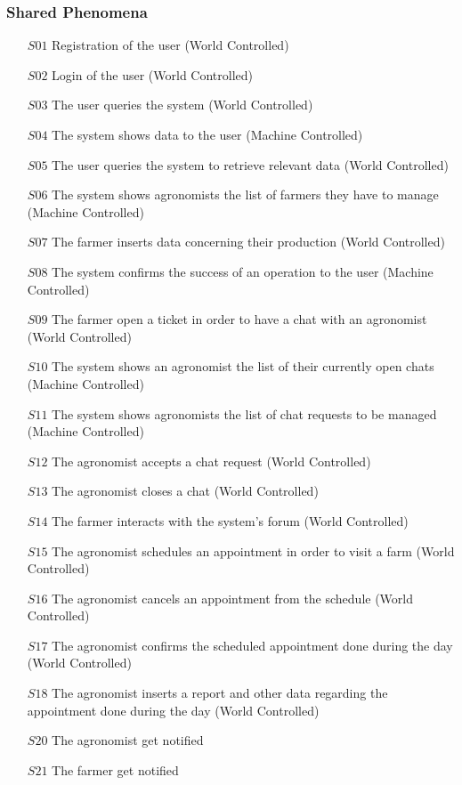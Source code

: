 \documentclass[10pt]{report}
\begin{document}
            \subsubsection{Shared Phenomena}
                \begin{itemize}%
                        \item [$S01$] Registration of the user (World Controlled)
                        \item [$S02$] Login of the user (World Controlled)
                        \item [$S03$] The user queries the system (World Controlled)
                        \item [$S04$] The system shows data to the user (Machine Controlled)
                        \item [$S05$] The user queries the system to retrieve relevant data (World Controlled)
                        \item [$S06$] The system shows agronomists the list of farmers they have to manage (Machine Controlled)
                        \item [$S07$] The farmer inserts data concerning their production (World Controlled)
                        \item [$S08$] The system confirms the success of an operation to the user (Machine Controlled)
                        \item [$S09$] The farmer open a ticket in order to have a chat with an agronomist (World Controlled)
                        \item [$S10$] The system shows an agronomist the list of their currently open chats (Machine Controlled)
                        \item [$S11$] The system shows agronomists the list of chat requests to be managed (Machine Controlled)
                        \item [$S12$] The agronomist accepts a chat request (World Controlled)
                        \item [$S13$] The agronomist closes a chat (World Controlled)
                        \item [$S14$] The farmer interacts with the system’s forum (World Controlled)
                        \item [$S15$] The agronomist schedules an appointment in order to visit a farm (World Controlled)
                        \item [$S16$] The agronomist cancels an appointment from the schedule (World Controlled)
                        \item [$S17$] The agronomist confirms the scheduled appointment done during the day (World Controlled)
                        \item [$S18$] The agronomist inserts a report and other data regarding the appointment done during the day (World Controlled)
                        \item [$S20$] The agronomist get notified
                        \item [$S21$] The farmer get notified
                    \end{itemize}
\end{document}
